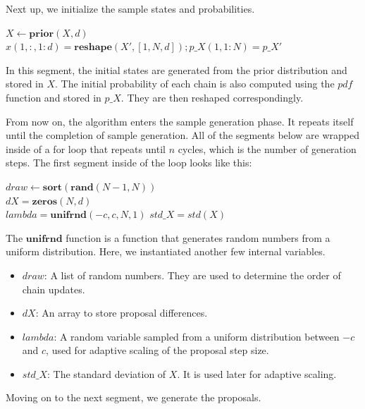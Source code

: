 Next up, we initialize the sample states and probabilities.\\
\begin{algorithm}[H]
$X \gets \textbf{prior}(X, d)$\\
$x(1, :, 1:d) = \textbf{reshape}(X', [1, N, d]); p\_X(1, 1:N) = p\_X'$
\end{algorithm}

In this segment, the initial states are generated from the prior distribution and stored in $X$. The initial probability of each chain is also computed using the $pdf$ function and stored in $p\_X$. They are then reshaped correspondingly.

From now on, the algorithm enters the sample generation phase. It repeats itself until the completion of sample generation. All of the segments below are wrapped inside of a for loop that repeats until $n$ cycles, which is the number of generation steps. The first segment inside of the loop looks like this:

\begin{algorithm}[H]
$ draw \gets \textbf{sort}(\textbf{rand}(N-1, N))$\\
$dX = \textbf{zeros}(N, d)$\\
$lambda = \textbf{unifrnd}(-c, c, N, 1)$
$std\_X = std(X)$
\end{algorithm}

The $\textbf{unifrnd}$ function is a function that generates random numbers from a uniform distribution. Here, we instantiated another few internal variables.
\begin{itemize}
    \item $draw$: A list of random numbers. They are used to determine the order of chain updates.
    \item $dX$: An array to store proposal differences.
    \item $lambda$: A random variable sampled from a uniform distribution between \(-c\) and \(c\), used for adaptive scaling of the proposal step size.
    \item $std\_X$: The standard deviation of $X$. It is used later for adaptive scaling.
\end{itemize}

Moving on to the next segment, we generate the proposals.

\begin{algorithm}[H]
\end{algorithm}

